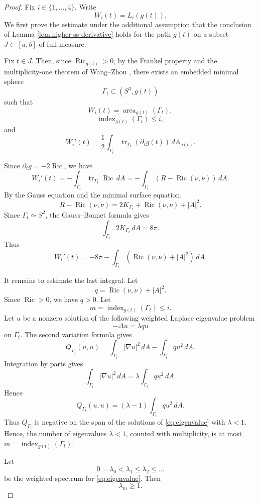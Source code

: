 \documentclass[12pt,english]{amsart}
\theoremstyle{definition}
\begin{document}
\begin{proof}
Fix $i \in \{1,\ldots,4\}$. Write
\[
W_i(t)=L_i(g(t)).
\]
We first prove the estimate under the additional assumption that the conclusion of Lemma \ref{lem:higher-ss-derivative} holds for the path \(g(t)\) on a subset $J \subset [a,b]$ of full measure.

Fix $t \in J$. Then, since \(\operatorname{Ric}_{g(t)}>0\), by the Frankel property and the multiplicity-one theorem of
Wang--Zhou \cite{WZ}, there exists an embedded minimal sphere
\[
\Gamma_t\subset (S^3,g(t))
\]
such that
\[
W_i(t)=\operatorname{area}_{g(t)}(\Gamma_t),
\]
\[
\operatorname{index}_{g(t)}(\Gamma_t)\le i,
\]
and
\[
W_i'(t)
=
\frac12
\int_{\Gamma_t}
\operatorname{tr}_{\Gamma_t}(\partial_t g(t))\,dA_{g(t)}.
\]

Since \(\partial_t g=-2\operatorname{Ric}\), we have
\[
W_i'(t)
=
-\int_{\Gamma_t}
\operatorname{tr}_{\Gamma_t}\operatorname{Ric}\,dA
=
-\int_{\Gamma_t}
\left(R-\operatorname{Ric}(\nu,\nu)\right)\,dA.
\]
By the Gauss equation and the minimal surface equation,
\[
R-\operatorname{Ric}(\nu,\nu)
=
2K_{\Gamma_t}
+
\operatorname{Ric}(\nu,\nu)
+
|A|^2.
\]
Since \(\Gamma_t\simeq S^2\), the Gauss--Bonnet formula gives
\[
\int_{\Gamma_t}2K_{\Gamma_t}\,dA=8\pi.
\]
Thus
\[
W_i'(t)
=
-8\pi
-
\int_{\Gamma_t}
\left(\operatorname{Ric}(\nu,\nu)+|A|^2\right)\,dA.
\]

It remains to estimate the last integral. Let
\[
q=\operatorname{Ric}(\nu,\nu)+|A|^2.
\]
Since \(\operatorname{Ric}>0\), we have \(q>0\). Let
\[
m=\operatorname{index}_{g(t)}(\Gamma_t)\le i.
\]
Let \(u\) be a nonzero solution of the following weighted Laplace eigenvalue problem
\begin{equation}
\label{eq:eigenvalue}
    -\Delta u=\lambda q u
\end{equation}
on \(\Gamma_t\). The second variation formula gives
\[
Q_{\Gamma_t}(u,u)
=
\int_{\Gamma_t}|\nabla u|^2\,dA
-
\int_{\Gamma_t}q u^2\,dA.
\]
Integration by parts gives
\[
\int_{\Gamma_t}|\nabla u|^2\,dA
=
\lambda
\int_{\Gamma_t}q u^2\,dA.
\]
Hence
\[
Q_{\Gamma_t}(u,u)
=
(\lambda-1)\int_{\Gamma_t}q u^2\,dA.
\]
Thus \(Q_{\Gamma_t}\) is negative on the span of the solutions of \eqref{eq:eigenvalue} with \(\lambda<1\). Hence, the number of eigenvalues \(\lambda<1\), counted with multiplicity, is at most $m=\operatorname{index}_{g(t)}(\Gamma_t)$.

Let
\[
0=\lambda_0<\lambda_1\le\lambda_2\le\ldots
\]
be the weighted spectrum for \eqref{eq:eigenvalue}. Then
\[
\lambda_m\ge 1.
\]


\end{proof}
\end{document}
